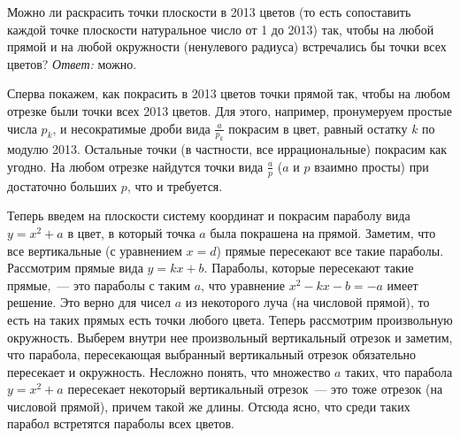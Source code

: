 \problem{}
Можно ли раскрасить точки плоскости в 2013 цветов
(то есть сопоставить каждой точке плоскости натуральное число от 1 до 2013)
так, чтобы на любой прямой и на любой окружности (ненулевого радиуса)
встречались бы точки всех цветов?
\solution
\emph{Ответ:} можно.
\par
Сперва покажем, как покрасить в 2013 цветов точки прямой так, чтобы на любом
отрезке были точки всех 2013 цветов.
Для этого, например, пронумеруем простые числа $p_k$, и несократимые дроби вида
$\frac{a}{p_k}$ покрасим в цвет, равный остатку $k$ по модулю 2013.
Остальные точки (в частности, все иррациональные) покрасим как угодно.
На любом отрезке найдутся точки вида $\frac{a}{p}$ ($a$ и $p$ взаимно просты)
при достаточно больших $p$, что и требуется.
\par
Теперь введем на плоскости систему координат и покрасим параболу вида
$y = x^2 + a$ в цвет, в который точка $a$ была покрашена на прямой.
Заметим, что все вертикальные (с уравнением $x = d$) прямые пересекают все
такие параболы.
Рассмотрим прямые вида $y = k x + b$.
Параболы, которые пересекают такие прямые,~--- это параболы с таким $a$, что
уравнение $x^2 - k x - b = -a$ имеет решение.
Это верно для чисел $a$ из некоторого луча (на числовой прямой), то есть
на таких прямых есть точки любого цвета.
Теперь рассмотрим произвольную окружность.
Выберем внутри нее произвольный вертикальный отрезок и заметим, что парабола,
пересекающая выбранный вертикальный отрезок обязательно пересекает и
окружность.
Несложно понять, что множество $a$ таких, что парабола $y = x^2 + a$ пересекает
некоторый вертикальный отрезок~--- это тоже отрезок (на числовой прямой),
причем такой же длины.
Отсюда ясно, что среди таких парабол встретятся параболы всех цветов.
\endproblem
